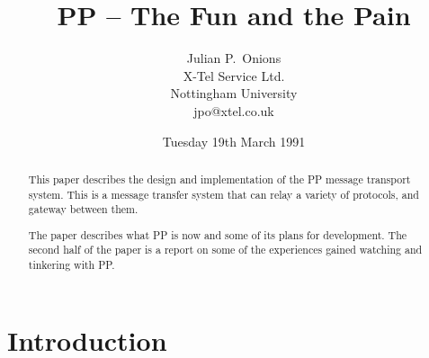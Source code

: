





\title{PP -- The Fun and the Pain}
\author{Julian P.~Onions\\[0.1in]
X-Tel Service Ltd.\\
Nottingham University\\[0.1in]
jpo@xtel.co.uk}
\date{Tuesday 19th March 1991}

\maketitle

\begin{abstract}
This paper describes the design and implementation of
the PP message transport system. This is a message transfer system
that can relay a variety of protocols, and gateway between them.

The paper describes what PP is now and some of its plans for
development. The second half of the paper is a report on some of the
experiences gained watching and tinkering with PP.
\end{abstract}

\section{Introduction}

